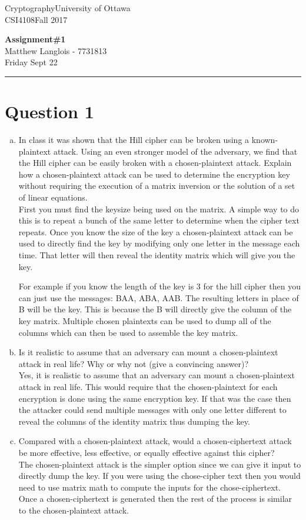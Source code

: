 \documentclass[fleqn, 12pt]{article}
\newcommand{\university}{University of Ottawa}
\newcommand{\name}{Matthew Langlois}
\newcommand{\studentNumber}{7731813}
\newcommand{\semester}{Fall 2017}
\newcommand{\assignmentType}{Assignment}
\newcommand{\assignemntNumber}{1}
\newcommand{\dueDate}{Friday Sept 22}
\newcommand{\courseCode}{CSI4108}
\newcommand{\courseTitle}{Cryptography}
\newcommand{\makeheader}{
    \noindent
    \courseTitle \hfill \university\\
    \courseCode \hfill \semester
    \begin{center}
        \textbf{\assignmentType \#\assignemntNumber}\\
        \name \hspace{1pt} - \studentNumber\\
        \dueDate\\ 
    \end{center}
    \vspace{6pt}
    \hrule
}
\begin{document}
\thispagestyle{firstpage}
\makeheader

\section*{Question 1}

\begin{enumerate}[a)]
    \item
        In class it was shown that the Hill cipher can be broken using a known-plaintext attack. Using an even stronger model of the adversary, we find that the Hill cipher can be easily broken with a chosen-plaintext attack. Explain how a chosen-plaintext attack can be used to determine the encryption key without requiring the execution of a matrix inversion or the solution of a set of linear equations.\\
        
        First you must find the keysize being used on the matrix. A simple way to do this is to repeat a bunch of the same letter to determine when the cipher text repeats. Once you know the size of the key a chosen-plaintext attack can be used to directly find the key by modifying only one letter in the message each time. That letter will then reveal the identity matrix which will give you the key.
        
        For example if you know the length of the key is 3 for the hill cipher then you can just use the messages: BAA, ABA, AAB. The resulting letters in place of B will be the key. This is because the B will directly give the column of the key matrix. Multiple chosen plaintexts can be used to dump all of the columns which can then be used to assemble the key matrix.
        
        
    \item
        Is it realistic to assume that an adversary can mount a chosen-plaintext attack in real life? Why or why not (give a convincing answer)?\\
        
        Yes, it is realistic to assume that an adversary can mount a chosen-plaintext attack in real life. This would require that the chosen-plaintext for each encryption is done using the same encryption key. If that was the case then the attacker could send multiple messages with only one letter different to reveal the columns of the identity matrix thus dumping the key.
        
    \item
        Compared with a chosen-plaintext attack, would a chosen-ciphertext attack be more effective, less effective, or equally effective against this cipher?\\
        
        The chosen-plaintext attack is the simpler option since we can give it input to directly dump the key. If you were using the chose-cipher text then you would need to use matrix math to compute the inputs for the chose-ciphertext. Once a chosen-ciphertext is generated then the rest of the process is similar to the chosen-plaintext attack.
\end{enumerate}
\end{document}
